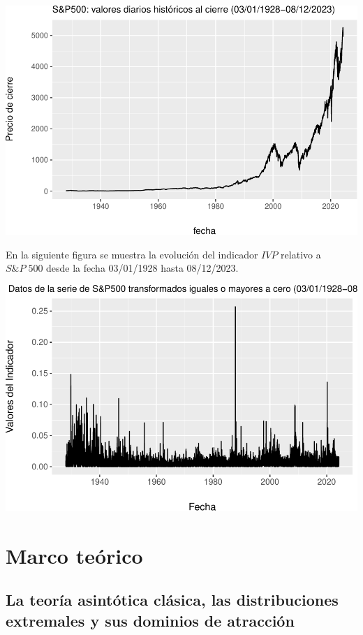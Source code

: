 \documentclass[
  12pt]{article}
\begin{document}
\includegraphics{Entrega_files/figure-latex/unnamed-chunk-21-1.pdf}

\newpage

En la siguiente figura se muestra la evolución del indicador \(IVP\)
relativo a \(S\&P\; 500\) desde la fecha 03/01/1928 hasta 08/12/2023.
\vspace{1cm}

\includegraphics{Entrega_files/figure-latex/unnamed-chunk-22-1.pdf}

\newpage

\section{Marco teórico}\label{marco-teuxf3rico}

\subsection{La teoría asintótica clásica, las distribuciones extremales
y sus dominios de
atracción}\label{la-teoruxeda-asintuxf3tica-cluxe1sica-las-distribuciones-extremales-y-sus-dominios-de-atracciuxf3n}
\end{document}
